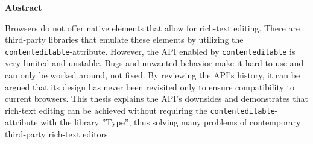 \thispagestyle{empty}
\noindent \textbf{Abstract}

\noindent Browsers do not offer native elements that allow for rich-text editing. There are third-party libraries that emulate these elements by utilizing the \texttt{contenteditable}-attribute. However, the API enabled by \texttt{contenteditable} is very limited and unstable. Bugs and unwanted behavior make it hard to use and can only be worked around, not fixed. By reviewing the API's history, it can be argued that its design has never been revisited only to ensure compatibility to current browsers. This thesis explains the API's downsides and demonstrates that rich-text editing can be achieved without requiring the \texttt{contenteditable}-attribute with the library ''Type'', thus solving many problems of contemporary third-party rich-text editors.
